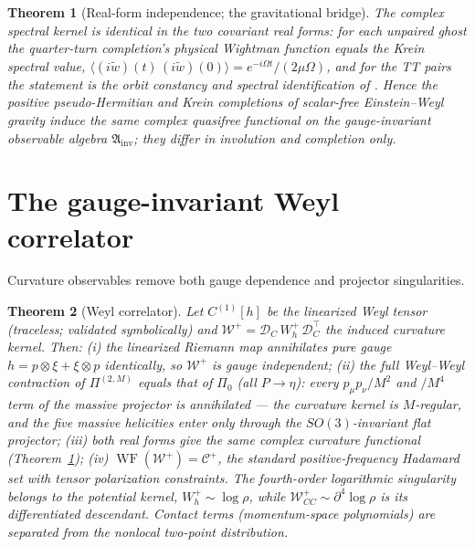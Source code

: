 \documentclass[11pt]{article}
\newtheorem{theorem}{Theorem}[section]
\theoremstyle{definition}
\theoremstyle{remark}
\newcommand{\WF}{\operatorname{WF}}
\begin{document}
\begin{theorem}[Real-form independence; the gravitational bridge]
\label{thm:bridge4}
The complex spectral kernel is identical in the two covariant real forms:
for each unpaired ghost the quarter-turn completion's physical Wightman
function equals the Krein spectral value,
$\langle(i\tilde w)(t)\,(i\tilde w)(0)\rangle
=e^{-i\Omega t}/(2\mu\Omega)$, and for the TT pairs the statement is the
orbit constancy and spectral identification of
\cite{companion3}.  Hence the positive pseudo-Hermitian and Krein
completions of scalar-free Einstein--Weyl gravity induce the same complex
quasifree functional on the gauge-invariant observable algebra
$\mathfrak A_{\mathrm{inv}}$; they differ in involution and completion
only.
\end{theorem}

\section{The gauge-invariant Weyl correlator}\label{sec:weyl}

Curvature observables remove both gauge dependence and projector
singularities.

\begin{theorem}[Weyl correlator]\label{thm:weyl}
Let $C^{(1)}[h]$ be the linearized Weyl tensor (traceless; validated
symbolically) and $\mathcal
W^+=\mathcal D_C\,W^+_h\,\mathcal D_C^{\top}$ the induced curvature
kernel.  Then: (i) the linearized Riemann map annihilates pure gauge
$h=p\otimes\xi+\xi\otimes p$ identically, so $\mathcal W^+$ is gauge
independent; (ii) the full Weyl--Weyl contraction of $\Pi^{(2,M)}$ equals
that of $\Pi_0$ (all $P\to\eta$): every $p_\mu p_\nu/M^2$ and $/M^4$ term
of the massive projector is annihilated --- the curvature kernel is
$M$-regular, and the five massive helicities enter only through the
$SO(3)$-invariant flat projector; (iii) both real forms give the same
complex curvature functional (Theorem~\ref{thm:bridge4}); (iv)
$\WF(\mathcal W^+)=\mathcal C^+$, the standard positive-frequency Hadamard
set with tensor polarization constraints.  The fourth-order logarithmic
singularity belongs to the potential kernel, $W_h^+\sim\log\rho$, while
$\mathcal W^+_{CC}\sim\partial^4\log\rho$ is its differentiated
descendant.  Contact terms (momentum-space polynomials) are separated from
the nonlocal two-point distribution.
\end{theorem}
\end{document}

